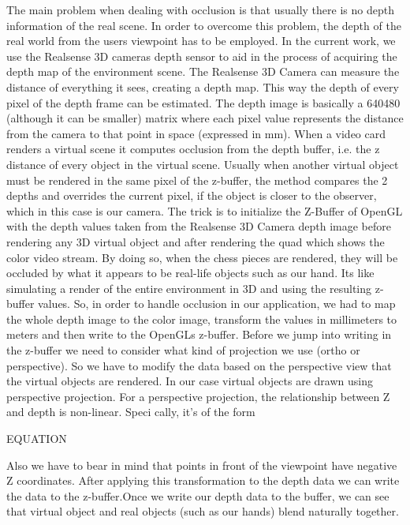 The main problem when dealing with occlusion is that usually there is no depth information of the real scene. In order to overcome this problem, the depth of the real world from the users viewpoint has to be employed. In the current work, we use the Realsense 3D cameras depth sensor to aid in the process of acquiring the depth map of the environment scene. The Realsense 3D Camera can measure the distance of everything it sees, creating a depth map. This way the depth of every pixel of the depth frame can be estimated. The depth image is basically a 640480 (although it can be smaller) matrix where each pixel value represents the distance from the camera to that point in space (expressed in mm). When a video card renders a virtual scene it computes occlusion from the depth buffer, i.e. the z distance of every object in the virtual scene. Usually when another virtual object must be rendered in the same pixel of the z-buffer, the method compares the 2 depths and overrides the current pixel, if the object is closer to the observer, which in this case is our camera. The trick is to initialize the Z-Buffer of OpenGL with the depth values taken from the Realsense 3D Camera depth image before rendering any 3D virtual object and after rendering the quad which shows the color video stream. By doing so, when the chess pieces are rendered, they will be occluded by what it appears to be real-life objects such as our hand. Its like simulating a render of the entire environment in 3D and using the resulting z-buffer values. So, in order to handle occlusion in our application, we had to map the whole depth image to the color image, transform the values in millimeters to meters and then write to the OpenGLs z-buffer. Before we jump into writing in the z-buffer we need to consider what kind of projection we use (ortho or perspective). So we have to modify the data based on the perspective view that the virtual objects are rendered. In our case virtual objects are drawn using perspective projection. For a perspective projection, the relationship between Z and depth is non-linear. Speci cally, it's of the form

EQUATION


Also we have to bear in mind that points in front of the viewpoint have negative Z coordinates. After applying this transformation to the depth data we can write the data to the z-buffer.Once we write our depth data to the buffer, we can see that virtual object and real objects (such as our hands) blend naturally together.




